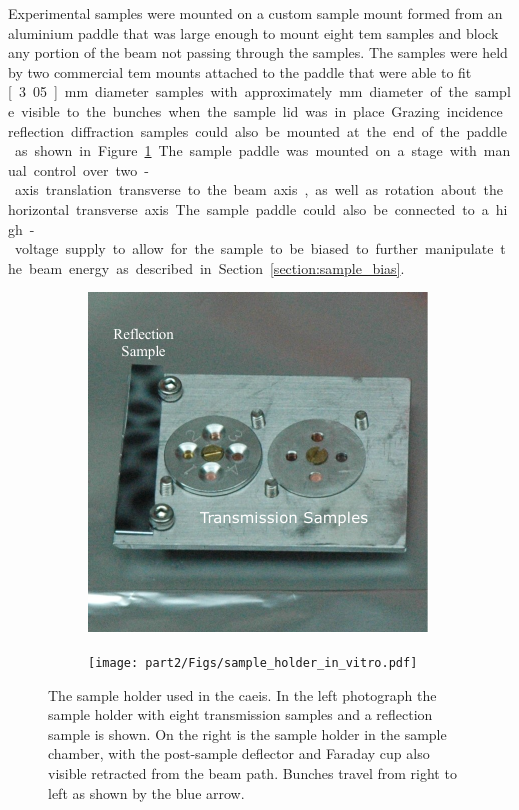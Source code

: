 Experimental samples were mounted on a custom sample mount formed from an aluminium paddle that was large enough to mount eight \gls{tem} samples and block any portion of the beam not passing through the samples.
The samples were held by two commercial \gls{tem} mounts attached to the paddle that were able to fit \unit[3.05]{mm} diameter samples with approximately \unit[2]{mm} diameter of the sample visible to the bunches when the sample lid was in place.
Grazing incidence reflection diffraction samples could also be mounted at the end of the paddle as shown in Figure~\ref{figure:sample_holder}.
The sample paddle was mounted on a stage with manual control over two-axis translation transverse to the beam axis, as well as rotation about the horizontal transverse axis.
The sample paddle could also be connected to a high-voltage supply to allow for the sample to be biased to further manipulate the beam energy as described in Section~\ref{section:sample_bias}.

\begin{figure}
    \centering
    \begin{subfigure}{0.49\linewidth}
    \centering
    \includegraphics[width=\linewidth]{part2/Figs/sample_holder_alone.pdf}
    \end{subfigure}
    \begin{subfigure}{0.49\linewidth}
    \centering
    \texttt{[image: part2/Figs/sample\_holder\_in\_vitro.pdf]}
    \end{subfigure}
    \caption[Sample holder.]{The sample holder used in the \gls{caeis}. In the left photograph the sample holder with eight transmission samples and a reflection sample is shown. On the right is the sample holder in the sample chamber, with the post-sample deflector and Faraday cup also visible retracted from the beam path. Bunches travel from right to left as shown by the blue arrow.}
    \label{figure:sample_holder}
\end{figure}

